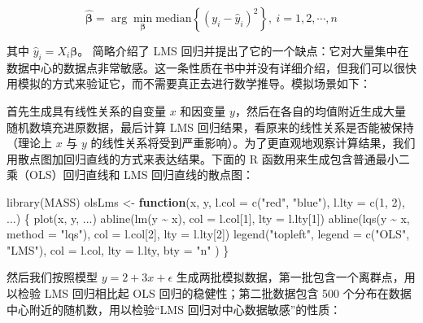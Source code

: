 \documentclass[
  b5paper,
  UTF8,twoside]{book}
\newenvironment{Shaded}{\begin{snugshade}}{\end{snugshade}}
\newcommand{\AttributeTok}[1]{\textcolor[rgb]{0.77,0.63,0.00}{#1}}
\newcommand{\ControlFlowTok}[1]{\textcolor[rgb]{0.13,0.29,0.53}{\textbf{#1}}}
\newcommand{\DecValTok}[1]{\textcolor[rgb]{0.00,0.00,0.81}{#1}}
\newcommand{\FunctionTok}[1]{\textcolor[rgb]{0.00,0.00,0.00}{#1}}
\newcommand{\NormalTok}[1]{#1}
\newcommand{\OtherTok}[1]{\textcolor[rgb]{0.56,0.35,0.01}{#1}}
\newcommand{\SpecialCharTok}[1]{\textcolor[rgb]{0.00,0.00,0.00}{#1}}
\newcommand{\StringTok}[1]{\textcolor[rgb]{0.31,0.60,0.02}{#1}}
\begin{document}
\[\hat{\boldsymbol{\beta}}=\arg\min_{\boldsymbol{\beta}}\text{median}\left\{ (y_{i}-\hat{y}_{i})^{2}\right\} ,\ i=1,2,\cdots,n\]

其中 \(\hat{y}_{i}=X_{i}\boldsymbol{\beta}\)。\citet{Venables02} 简略介绍了 LMS 回归并提出了它的一个缺点：它对大量集中在数据中心的数据点非常敏感。这一条性质在书中并没有详细介绍，但我们可以很快用模拟的方式来验证它，而不需要真正去进行数学推导。模拟场景如下：

首先生成具有线性关系的自变量 \(x\) 和因变量 \(y\)，然后在各自的均值附近生成大量随机数填充进原数据，最后计算 LMS 回归结果，看原来的线性关系是否能被保持（理论上 \(x\) 与 \(y\) 的线性关系将受到严重影响）。为了更直观地观察计算结果，我们用散点图加回归直线的方式来表达结果。下面的 R 函数用来生成包含普通最小二乘（OLS）回归直线和 LMS 回归直线的散点图：

\begin{Shaded}
\begin{Highlighting}[]
\FunctionTok{library}\NormalTok{(MASS)}
\NormalTok{olsLms }\OtherTok{\textless{}{-}} \ControlFlowTok{function}\NormalTok{(x, y, }\AttributeTok{l.col =} \FunctionTok{c}\NormalTok{(}\StringTok{"red"}\NormalTok{, }\StringTok{"blue"}\NormalTok{),}
                   \AttributeTok{l.lty =} \FunctionTok{c}\NormalTok{(}\DecValTok{1}\NormalTok{, }\DecValTok{2}\NormalTok{), ...) \{}
  \FunctionTok{plot}\NormalTok{(x, y, ...)}
  \FunctionTok{abline}\NormalTok{(}\FunctionTok{lm}\NormalTok{(y }\SpecialCharTok{\textasciitilde{}}\NormalTok{ x), }\AttributeTok{col =}\NormalTok{ l.col[}\DecValTok{1}\NormalTok{], }\AttributeTok{lty =}\NormalTok{ l.lty[}\DecValTok{1}\NormalTok{])}
  \FunctionTok{abline}\NormalTok{(}\FunctionTok{lqs}\NormalTok{(y }\SpecialCharTok{\textasciitilde{}}\NormalTok{ x, }\AttributeTok{method =} \StringTok{"lqs"}\NormalTok{), }\AttributeTok{col =}\NormalTok{ l.col[}\DecValTok{2}\NormalTok{], }\AttributeTok{lty =}\NormalTok{ l.lty[}\DecValTok{2}\NormalTok{])}
  \FunctionTok{legend}\NormalTok{(}\StringTok{"topleft"}\NormalTok{,}
    \AttributeTok{legend =} \FunctionTok{c}\NormalTok{(}\StringTok{"OLS"}\NormalTok{, }\StringTok{"LMS"}\NormalTok{), }\AttributeTok{col =}\NormalTok{ l.col,}
    \AttributeTok{lty =}\NormalTok{ l.lty, }\AttributeTok{bty =} \StringTok{"n"}
\NormalTok{  )}
\NormalTok{\}}
\end{Highlighting}
\end{Shaded}

然后我们按照模型 \(y=2+3x+\epsilon\) 生成两批模拟数据，第一批包含一个离群点，用以检验 LMS 回归相比起 OLS 回归的稳健性；第二批数据包含 500 个分布在数据中心附近的随机数，用以检验``LMS 回归对中心数据敏感''的性质：
\end{document}
